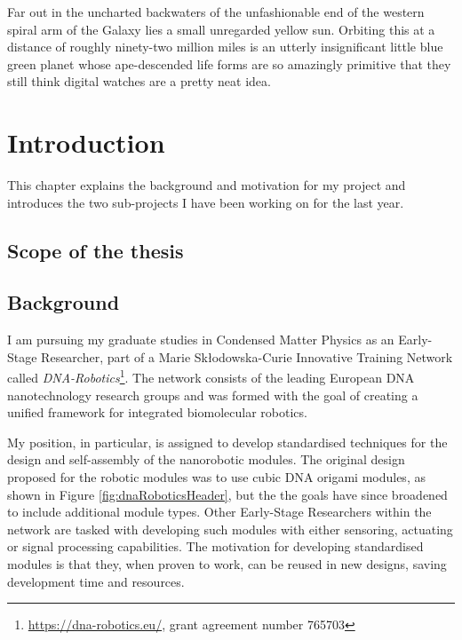 \begin{savequote}[8cm]
Far out in the uncharted backwaters of the unfashionable end of the western spiral arm of the Galaxy lies a small unregarded yellow sun. Orbiting this at a distance of roughly ninety-two million miles is an utterly insignificant little blue green planet whose ape-descended life forms are so amazingly primitive that they still think digital watches are a pretty neat idea.
\end{savequote}

\chapter{\label{ch:1-intro}Introduction} 
This chapter explains the background and motivation for my project and introduces the two sub-projects I have been working on for the last year.
\minitoc

\section{Scope of the thesis}

\section{Background}
I am pursuing my graduate studies in Condensed Matter Physics as an Early-Stage Researcher, part of a Marie Skłodowska-Curie Innovative Training Network called \emph{DNA-Robotics}\footnote{\url{https://dna-robotics.eu/}, grant agreement number 765703}. The network consists of the leading European DNA nanotechnology research groups and was formed with the goal of creating a unified framework for integrated biomolecular robotics\cite{dnaroboticsResearch}.

My position, in particular, is assigned to develop standardised techniques for the design and self-assembly of the nanorobotic modules\cite{dnaroboticsESR12}. The original design proposed for the robotic modules was to use cubic DNA origami modules, as shown in Figure \ref{fig:dnaRoboticsHeader}, but the the goals have since broadened to include additional module types. Other Early-Stage Researchers within the network are tasked with developing such modules with either sensoring, actuating or signal processing capabilities. The motivation for developing standardised modules is that they, when proven to work, can be reused in new designs, saving development time and resources.

